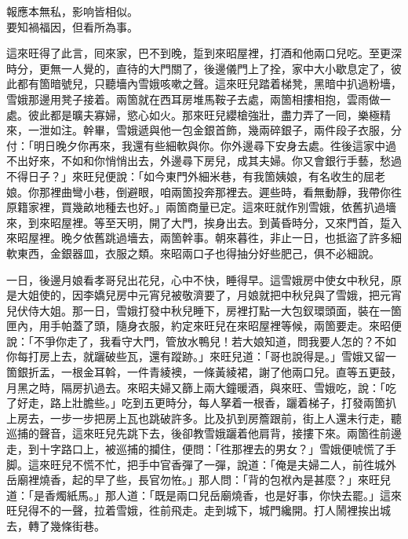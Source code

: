 \begin{myquote}
報應本無私，影响皆相似。\\要知禍福因，但看所為事。
\end{myquote}

這來旺得了此言，囘來家，巴不到晚，踅到來昭屋裡，打酒和他兩口兒吃。至更深時分，更無一人覺的，直待的大門關了，後邊儀門上了拴，家中大小歇息定了，彼此都有箇暗號兒，只聽墻內雪娥咳嗽之聲。這來旺兒踏着梯凳，黑暗中扒過粉墻，雪娥那邊用凳子接着。兩箇就在西耳房堆馬鞍子去處，兩箇相摟相抱，雲雨做一處。彼此都是曠夫寡婦，慾心如火。那來旺兒纓槍強壯，盡力弄了一囘，樂極精來，一泄如注。幹畢，雪娥遞與他一包金銀首飾，幾兩碎銀子，兩件段子衣服，分付：「明日晚夕你再來，我還有些細軟與你。你外邊尋下安身去處。徃後這家中過不出好來，不如和你悄悄出去，外邊尋下房兒，成其夫婦。你又會銀行手藝，愁過不得日子？」{}來旺兒便說：「如今東門外細米巷，有我箇姨娘，有名收生的屈老娘。你那裡曲彎小巷，倒避眼，咱兩箇投奔那裡去。遲些時，看無動靜，我帶你徃原籍家裡，買幾畝地種去也好。」兩箇商量已定。這來旺就作別雪娥，依舊扒過墻來，到來昭屋裡。等至天明，開了大門，挨身出去。到黃昏時分，又來門首，踅入來昭屋裡。晚夕依舊跳過墻去，兩箇幹事。朝來暮徃，非止一日，也抵盜了許多細軟東西，金銀器皿，衣服之類。來昭兩口子也得抽分好些肥己，俱不必細說。

一日，後邊月娘看孝哥兒出花兒，心中不快，睡得早。這雪娥房中使女中秋兒，原是大姐使的，因李嬌兒房中元宵兒被敬濟要了，月娘就把中秋兒與了雪娥，把元宵兒伏侍大姐。那一日，雪娥打發中秋兒睡下，房裡打點一大包釵環頭面，裝在一箇匣內，用手帕蓋了頭，隨身衣服，約定來旺兒在來昭屋裡等候，兩箇要走。來昭便說：「不爭你走了，我看守大門，管放水鴨兒！若大娘知道，問我要人怎的？不如你每打房上去，就躧破些瓦，還有蹤跡。」來旺兒道：「哥也說得是。」雪娥又留一箇銀折盂，一根金耳斡，一件青綾襖，一條黃綾裙，謝了他兩口兒。直等五更鼓，月黑之時，隔房扒過去。來昭夫婦又篩上兩大鐘暖酒，與來旺、雪娥吃，說：「吃了好走，路上壯膽些。」吃到五更時分，每人拏着一根香，躧着梯子，打發兩箇扒上房去，一步一步把房上瓦也跳破許多。比及扒到房簷跟前，街上人還未行走，聽巡捕的聲音，這來旺兒先跳下去，後卻教雪娥躧着他肩背，接摟下來。兩箇徃前邊走，到十字路口上，被巡捕的攔住，{}便問：「徃那裡去的男女？」雪娥便唬慌了手脚。這來旺兒不慌不忙，把手中官香彈了一彈，說道：「俺是夫婦二人，前徃城外岳廟裡燒香，起的早了些，長官勿恠。」那人問：「背的包袱內是甚麼？」來旺兒道：「是香燭紙馬。」那人道：「既是兩口兒岳廟燒香，也是好事，你快去罷。」這來旺兒得不的一聲，拉着雪娥，徃前飛走。走到城下，城門纔開。打人鬧裡挨出城去，轉了幾條街巷。

